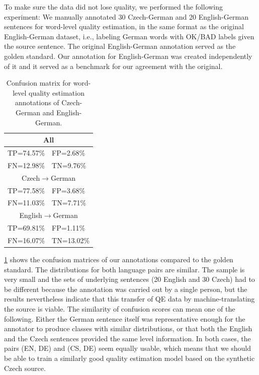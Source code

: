 To make sure the data did not lose quality, we performed the following experiment: We manually annotated 30 Czech-German and 20 English-German sentences for word-level quality estimation, in the same format as the original English-German dataset, i.e., labeling German words with OK/BAD labels given the source sentence. The original English-German annotation served as the golden standard. Our annotation for English-German was created independently of it and it served as a benchmark for our agreement with the original. 

\begin{table}[ht]
    \centering
    \begin{tabular}{| l l |}
        \hline
        \multicolumn{2}{|c|}{All}\\
        \hline
        TP=74.57\%& FP=2.68\%\\
        FN=12.98\%& TN=9.76\%\\
        \hline
        \multicolumn{2}{|c|}{Czech$\rightarrow$German}\\
        \hline
        TP=77.58\%& FP=3.68\%\\
        FN=11.03\%& TN=7.71\%\\
        \hline
        \multicolumn{2}{|c|}{English$\rightarrow$German}\\
        \hline
        TP=69.81\%& FP=1.11\%\\
        FN=16.07\%& TN=13.02\%\\
        \hline
    \end{tabular}
    \caption{\label{tab:manual_qe_annotation}Confusion matrix for word-level quality estimation annotations of Czech-German and English-German.}
\end{table}

\cref{tab:manual_qe_annotation} shows the confusion matrices of our annotations compared to the golden standard. The distributions for both language pairs are similar. The sample is very small and the sets of underlying sentences (20 English and 30 Czech) had to be different because the annotation was carried out by a single person, but the results nevertheless indicate that this transfer of QE data by machine-translating the source is viable. The similarity of confusion scores can mean one of the following. Either the German sentence itself was representative enough for the annotator to produce classes with similar distributions, or that both the English and the Czech sentences provided the same level information. In both cases, the pairs (EN, DE) and (CS, DE) seem equally usable, which means that we should be able to train a similarly good quality estimation model based on the synthetic Czech source.